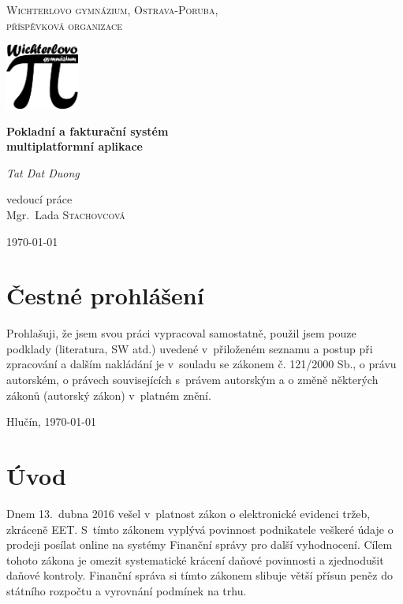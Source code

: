 \documentclass[a4paper,11pt,oneside]{article}
\begin{document}
\begin{titlepage}

\centering
{\scshape\large Wichterlovo gymnázium, Ostrava-Poruba,\\příspěvková organizace\par}
\vspace{1.2cm}
\includegraphics[width=0.18\textwidth]{../wigym}
\par
\vspace{2cm}
\vspace{1.5cm}
{\huge\bfseries Pokladní a fakturační systém\\multiplatformní aplikace\par}
\vspace{.3cm}
{\Large\itshape Tat Dat Duong\par}

\vfill
vedoucí práce\\
Mgr.~Lada \textsc{Stachovcová}
\vfill

{\large \today\par}
\pagebreak
\end{titlepage}

\vspace*{\fill}
\vspace*{\fill}

\section*{Čestné prohlášení}

Prohlašuji, že jsem svou práci vypracoval samostatně, použil jsem pouze podklady (literatura, SW atd.) uvedené v~přiloženém seznamu a postup při zpracování a dalším nakládání je v~souladu se zákonem č. 121/2000 Sb., o právu autorském, o právech souvisejících s~právem autorským a o změně některých zákonů (autorský zákon) v~platném znění.

\bigskip

\noindent Hlučín, \today

\vspace*{\fill}

\pagebreak
\pagestyle{fancy}

\tableofcontents

\pagebreak
\section{Úvod}
Dnem 13.~dubna 2016\cite{eetzakon} vešel v~platnost zákon o elektronické evidenci tržeb, zkráceně EET. S~tímto zákonem vyplývá povinnost podnikatele veškeré údaje o prodeji posílat online na systémy Finanční správy pro další vyhodnocení. Cílem tohoto zákona je omezit systematické krácení daňové povinnosti a zjednodušit daňové kontroly. Finanční správa si tímto zákonem slibuje větší přísun peněz do státního rozpočtu a vyrovnání podmínek na trhu. 
\end{document}
